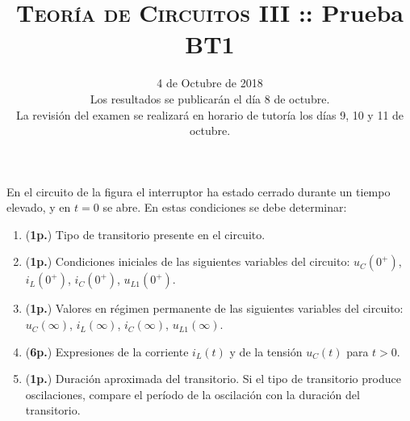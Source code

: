 \documentclass[12pt]{article}
\begin{document}
\title{\textsc{Teoría de Circuitos III} :: Prueba BT1}

\date{4 de Octubre de  2018\\\small{Los resultados se publicarán el día 8 de octubre.\\La revisión del examen se realizará en horario de tutoría los días 9, 10 y 11 de octubre.}}

\maketitle

En el circuito de la figura el interruptor ha estado cerrado durante un tiempo elevado, y en $t = 0$ se abre. En estas condiciones se debe determinar:

\begin{enumerate}
\item (\textbf{1p.}) Tipo de transitorio presente en el circuito.

\item (\textbf{1p.}) Condiciones iniciales de las siguientes variables del circuito: $u_C(0^+)$, $i_L(0^+)$, $i_C(0^+)$, $u_{L1}(0^+)$.
\item (\textbf{1p.}) Valores en régimen permanente de las siguientes variables del circuito: $u_C(\infty)$, $i_L(\infty)$, $i_C(\infty)$, $u_{L1}(\infty)$.
\item (\textbf{6p.}) Expresiones de la corriente $i_L(t)$ y de la tensión $u_C(t)$ para  $t > 0$.

\item (\textbf{1p.}) Duración aproximada del transitorio. Si el tipo de transitorio produce oscilaciones, compare el período de la oscilación con la duración del transitorio.
\end{enumerate}
\end{document}
